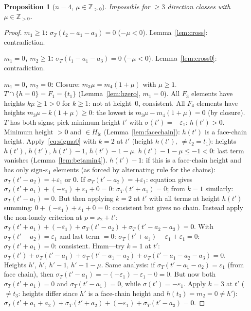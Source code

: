 \documentclass{article}
\newtheorem{prop}{Proposition}
\begin{document}
\begin{prop}[$n=4$, $\mu\in\mathbb Z_{>0}$]\label{prop:n4muZ}
Impossible for $\ge 3$ direction classes with $\mu\in\mathbb Z_{>0}$.
\end{prop}
\begin{proof}
\textbf{$m_1\ge 1$:} $\sigma_T(t_2-a_1-a_3)=0$ ($-\mu<0$). Lemma~\ref{lem:cross}: contradiction.

\textbf{$m_1=0$, $m_2\ge 1$:} $\sigma_T(t_1-a_1-a_3)=0$ ($-\mu<0$). Lemma~\ref{lem:cross0}: contradiction.

\textbf{$m_1=0$, $m_2=0$:}
Closure: $m_3\mu=m_4(1+\mu)$ with $\mu\ge 1$.
$T\cap\{h=0\}=F_1=\{t_1\}$ (Lemma~\ref{lem:hzero}, $m_1=0$).
All $F_3$ elements have heights $k\mu\ge 1>0$ for $k\ge 1$: not at height~$0$, consistent.
All $F_4$ elements have heights $m_3\mu-k(1+\mu)\ge 0$: the lowest is $m_3\mu-m_4(1+\mu)=0$ (by closure).
$T$ has both signs; pick minimum-height $t'$ with $\sigma(t')=-\varepsilon_1$: $h(t')>0$.
Minimum height $>0$ and $\in H_{\mathrm{fc}}$ (Lemma~\ref{lem:facechain}): $h(t')$ is a face-chain height.
Apply~\eqref{eq:sigma0} with $k=2$ at $t'$ (height $h(t')$, $\ne t_2=t_1$):
heights $h(t')$, $h(t')$, $h(t')-1$, $h(t')-1-\mu$.
$h(t')-1-\mu\le-1<0$: last term vanishes (Lemma~\ref{lem:betamin4}).
$h(t')-1$: if this is a face-chain height and has only sign-$\varepsilon_1$ elements (as forced by alternating rule for the chains): $\sigma_T(t'-a_2)=+\varepsilon_1$ or $0$.
If $\sigma_T(t'-a_2)=+\varepsilon_1$: equation gives $\sigma_T(t'+a_1)+(-\varepsilon_1)+\varepsilon_1+0=0$: $\sigma_T(t'+a_1)=0$; from $k=1$ similarly: $\sigma_T(t'-a_1)=0$.  But then applying $k=2$ at $t'$ with all terms at height $h(t')$ summing: $0+(-\varepsilon_1)+\varepsilon_1+0=0$: consistent but gives no chain.
Instead apply the non-lonely criterion at $p=s_2+t'$:
$\sigma_T(t'+a_1)+(-\varepsilon_1)+\sigma_T(t'-a_2)+\sigma_T(t'-a_2-a_3)=0$.
With $\sigma_T(t'-a_2)=\varepsilon_1$ and last term $=0$: $\sigma_T(t'+a_1)-\varepsilon_1+\varepsilon_1=0$: $\sigma_T(t'+a_1)=0$: consistent.
Hmm---try $k=1$ at $t'$:
$\sigma_T(t')+\sigma_T(t'-a_1)+\sigma_T(t'-a_1-a_2)+\sigma_T(t'-a_1-a_2-a_3)=0$.
Heights $h'$, $h'$, $h'-1$, $h'-1-\mu$.  Same analysis: if $\sigma_T(t'-a_1-a_2)=\varepsilon_1$ (from face chain), then $\sigma_T(t'-a_1)=-(-\varepsilon_1)-\varepsilon_1-0=0$.
But now both $\sigma_T(t'+a_1)=0$ and $\sigma_T(t'-a_1)=0$, while $\sigma(t')=-\varepsilon_1$.
Apply $k=3$ at $t'$ ($\ne t_3$: heights differ since $h'$ is a face-chain height and $h(t_3)=m_2=0\ne h'$):
$\sigma_T(t'+a_1+a_2)+\sigma_T(t'+a_2)+(-\varepsilon_1)+\sigma_T(t'-a_3)=0$.

\end{proof}
\end{document}
